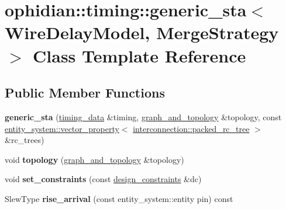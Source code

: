 \hypertarget{classophidian_1_1timing_1_1generic__sta}{\section{ophidian\-:\-:timing\-:\-:generic\-\_\-sta$<$ Wire\-Delay\-Model, Merge\-Strategy $>$ Class Template Reference}
\label{classophidian_1_1timing_1_1generic__sta}
}
\subsection*{Public Member Functions}
\begin{DoxyCompactItemize}
\item 
\hypertarget{classophidian_1_1timing_1_1generic__sta_a7d517156c5238d029423266f0702c537}{{\bfseries generic\-\_\-sta} (\hyperlink{structophidian_1_1timing_1_1timing__data}{timing\-\_\-data} \&timing, \hyperlink{structophidian_1_1timing_1_1graph__and__topology}{graph\-\_\-and\-\_\-topology} \&topology, const \hyperlink{classophidian_1_1entity__system_1_1vector__property}{entity\-\_\-system\-::vector\-\_\-property}$<$ \hyperlink{classophidian_1_1interconnection_1_1packed__rc__tree}{interconnection\-::packed\-\_\-rc\-\_\-tree} $>$ \&rc\-\_\-trees)}\label{classophidian_1_1timing_1_1generic__sta_a7d517156c5238d029423266f0702c537}

\item 
\hypertarget{classophidian_1_1timing_1_1generic__sta_a05375772964ee702ae645f18378377c7}{void {\bfseries topology} (\hyperlink{structophidian_1_1timing_1_1graph__and__topology}{graph\-\_\-and\-\_\-topology} \&topology)}\label{classophidian_1_1timing_1_1generic__sta_a05375772964ee702ae645f18378377c7}

\item 
\hypertarget{classophidian_1_1timing_1_1generic__sta_aaca1caf94c74f09ed8a4fb8121b1d822}{void {\bfseries set\-\_\-constraints} (const \hyperlink{structophidian_1_1timing_1_1design__constraints}{design\-\_\-constraints} \&dc)}\label{classophidian_1_1timing_1_1generic__sta_aaca1caf94c74f09ed8a4fb8121b1d822}

\item 
\hypertarget{classophidian_1_1timing_1_1generic__sta_a37826b55b268886efeb9b62fbfe81bea}{Slew\-Type {\bfseries rise\-\_\-arrival} (const entity\-\_\-system\-::entity pin) const }\label{classophidian_1_1timing_1_1generic__sta_a37826b55b268886efeb9b62fbfe81bea}


\end{DoxyCompactItemize}
